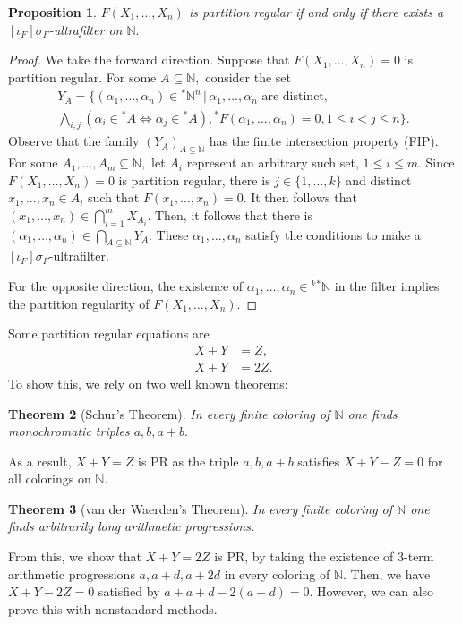 \documentclass[12pt]{amsart}
\newcommand{\stt}{{}^*}
\newcommand{\NN}{\mathbb{N}}
\theoremstyle{plain}
\newtheorem{thm}{Theorem}
\newtheorem{prop}[thm]{Proposition}
\theoremstyle{definition}
\theoremstyle{remark}
\theoremstyle{theorem}
\numberwithin{equation}{section}
\numberwithin{thm}{section}
\begin{document}
\begin{prop} \label{ufimp}
$F(X_1, \ldots, X_n)$ is partition regular if and only if there exists a $[\iota_F]\sigma_F$-ultrafilter on $\NN.$
\end{prop}
\begin{proof}
We take the forward direction. Suppose that $F(X_1, \ldots, X_n)=0$ is partition regular. For some $A \subseteq \NN,$ consider the set 
\begin{multline*}
Y_A = \{(\alpha_1, \ldots , \alpha_n) \in \stt \NN ^n \, | \, \alpha_1, \ldots , \alpha_n \text{ are distinct}, \\ \bigwedge_{i,j}(\alpha_i \in \stt A \iff \alpha_j \in \stt A), \stt F(\alpha_1, \ldots , \alpha_n) = 0, 1 \leq i < j \leq n \}. 
\end{multline*}
Observe that the family $(Y_A)_{A \subseteq \NN}$ has the finite intersection property (FIP). For some $A_1, \ldots, A_m \subseteq \NN,$ let $A_i$ represent an arbitrary such set, $1 \leq i \leq m.$  Since $F(X_1, \ldots, X_n) = 0$ is partition regular, there is $j \in \{1, \ldots , k \}$ and distinct $x_1, \ldots , x_n \in A_i$ such that $F(x_1, \ldots , x_n) = 0.$ It then follows that $(x_1, \ldots , x_n) \in \bigcap ^{m}_{i=1} X_{A_i}.$ Then, it follows that there is $(\alpha_1, \ldots , \alpha_n) \in \bigcap_{A \subseteq \NN}Y_A.$ These $\alpha_1, \ldots , \alpha_n$ satisfy the conditions to make a $[\iota_F]\sigma_F$-ultrafilter.

For the opposite direction, the existence of $\alpha_1, \ldots, \alpha_n \in {}^k\stt \NN$ in the filter implies the partition regularity of $F(X_1, \ldots , X_n).$

\end{proof}
Some partition regular equations are 
\begin{align*}
    X + Y &= Z, \\
    X + Y &= 2Z. 
\end{align*}
To show this, we rely on two well known theorems:
\begin{thm}[Schur's Theorem] \label{schur}
In every finite coloring of $\NN$ one finds monochromatic triples $a,b,a+b.$
\end{thm}
As a result, $X + Y = Z$ is PR as the triple $a,b,a+b$ satisfies $X+Y-Z = 0$ for all colorings on $\NN.$
\begin{thm}[van der Waerden's Theorem] \label{Waerden}
In every finite coloring of $\NN$ one finds arbitrarily long arithmetic progressions.
\end{thm}
From this, we show that $X+Y=2Z$ is PR, by taking the existence of $3$-term arithmetic progressions $a, a+d, a+2d$ in every coloring of $\NN.$ Then, we have $X + Y - 2Z = 0$ satisfied by $a + a+d -2(a+d) = 0.$ However, we can also prove this with nonstandard methods.
\end{document}
